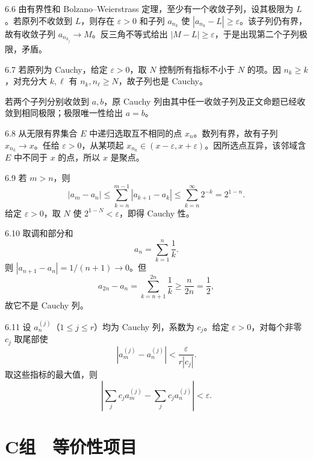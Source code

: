 \begin{solution}{6.6}
由有界性和 Bolzano--Weierstrass 定理，至少有一个收敛子列，设其极限为 \(L\)。若原列不收敛到 \(L\)，则存在 \(\varepsilon>0\) 和子列 \(a_{n_k}\) 使 \(|a_{n_k}-L|\ge\varepsilon\)。该子列仍有界，故有收敛子列 \(a_{n_{k_j}}\to M\)。反三角不等式给出 \(|M-L|\ge\varepsilon\)，于是出现第二个子列极限，矛盾。
\end{solution}

\begin{solution}{6.7}
若原列为 Cauchy，给定 \(\varepsilon>0\)，取 \(N\) 控制所有指标不小于 \(N\) 的项。因 \(n_k\ge k\)，对充分大 \(k,\ell\) 有 \(n_k,n_\ell\ge N\)，故子列也是 Cauchy。

若两个子列分别收敛到 \(a,b\)，原 Cauchy 列由其中任一收敛子列及正文命题已经收敛到相同极限；极限唯一性给出 \(a=b\)。
\end{solution}

\begin{solution}{6.8}
从无限有界集合 \(E\) 中递归选取互不相同的点 \(x_n\)。数列有界，故有子列 \(x_{n_k}\to x\)。任给 \(\varepsilon>0\)，从某项起 \(x_{n_k}\in(x-\varepsilon,x+\varepsilon)\)。因所选点互异，该邻域含 \(E\) 中不同于 \(x\) 的点，所以 \(x\) 是聚点。
\end{solution}

\begin{solution}{6.9}
若 \(m>n\)，则
\[
 |a_m-a_n|\le\sum_{k=n}^{m-1}|a_{k+1}-a_k|
 \le\sum_{k=n}^{\infty}2^{-k}=2^{1-n}.
\]
给定 \(\varepsilon>0\)，取 \(N\) 使 \(2^{1-N}<\varepsilon\)，即得 Cauchy 性。
\end{solution}

\begin{solution}{6.10}
取调和部分和
\[
 a_n=\sum_{k=1}^n\frac1k.
\]
则 \(|a_{n+1}-a_n|=1/(n+1)\to0\)。但
\[
 a_{2n}-a_n=\sum_{k=n+1}^{2n}\frac1k\ge\frac n{2n}=\frac12,
\]
故它不是 Cauchy 列。
\end{solution}

\begin{solution}{6.11}
设 \(a^{(j)}_n\)（\(1\le j\le r\)）均为 Cauchy 列，系数为 \(c_j\)。给定 \(\varepsilon>0\)，对每个非零 \(c_j\) 取尾部使
\[
 |a^{(j)}_m-a^{(j)}_n|<\frac{\varepsilon}{r|c_j|}.
\]
取这些指标的最大值，则
\[
 \left|\sum_jc_ja^{(j)}_m-\sum_jc_ja^{(j)}_n\right|<\varepsilon.
\]
\end{solution}

\section*{C组　等价性项目}

